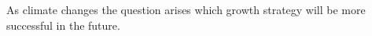 \documentclass{article}
\begin{document}
	As climate changes the question arises which growth strategy will be more successful in the future.

								
\end{document}
